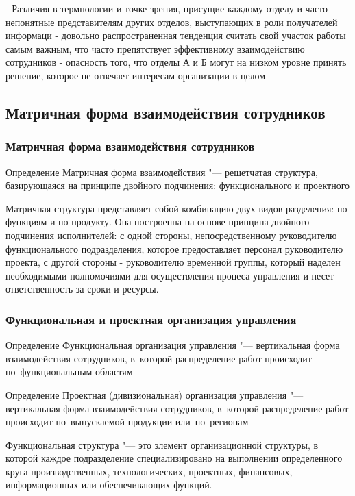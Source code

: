 \documentclass{../industrial-development}
\begin{document}
\lecturenotes
- Различия в термнологии и точке зрения, присущие каждому отде­лу и часто непонятные представителям других отделов, вы­ступающих в роли получателей информаци
- довольно распространен­ная тенденция считать свой участок работы самым важ­ным, что часто препятствует эффективному взаимодей­ствию сотрудников
- опасность того, что отделы А и Б могут на низком уровне принять решение, которое не отвечает интересам организации в целом

\subsection{Матричная форма взаимодействия сотрудников}

\begin{frame} \frametitle{Матричная форма взаимодействия сотрудников}
	\begin{block}{Определение}
		\alert{Матричная форма взаимодействия} "--- решетчатая структура, базирующаяся на принципе  двойного подчинения: функционального и проектного
	\end{block}
\end{frame}

\lecturenotes
Матричная структура представляет собой комбинацию двух видов разделения: по функциям и по продукту. Она построенна на основе принципа двойного подчинения исполнителей: с одной стороны, непосредственному руководителю функционального подразделения, которое предоставляет персонал руководителю проекта, с другой стороны  - руководителю временной группы, который наделен необходимыми полномочиями для осуществления процеса управления и несет ответственность за сроки и ресурсы.

\begin{frame} \frametitle{Функциональная и проектная организация управления}
	\begin{block}{Определение}
		\alert{Функциональная организация управления} "--- вертикальная форма взаимодействия сотрудников, в~которой распределение работ происходит по~функциональным областям
	\end{block}
	\begin{block}{Определение}
		\alert{Проектная (дивизиональная) организация управления} "--- вертикальная форма взаимодействия сотрудников, в~которой распределение работ происходит по~выпускаемой продукции или~по~регионам
	\end{block}
\end{frame}

\lecturenotes
Функциональная структура "--- это элемент организационной структуры, в которой каждое подразделение специализировано на выполнении определенного круга производственных, технологических, проектных, финансовых, информационных или обеспечивающих функций.
\end{document}
